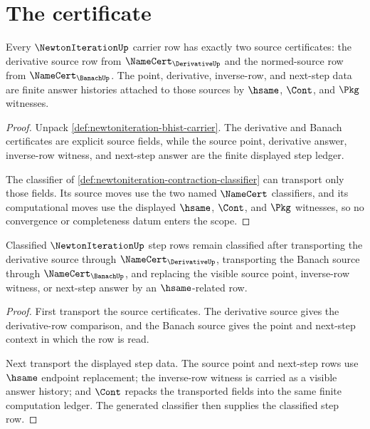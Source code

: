 \section{The certificate}
\label{sec:newtoniteration-certificate}

\begin{theorem}
\label{thm:newtoniteration-banach-derivative-source-scope}
Every $\NewtonIterationUp$ carrier row has exactly two source certificates: the derivative source row from $\NameCert_{\DerivativeUp}$ and the normed-source row from $\NameCert_{\BanachUp}$. The point, derivative, inverse-row, and next-step data are finite answer histories attached to those sources by $\hsame$, $\Cont$, and $\Pkg$ witnesses.
\end{theorem}
\begin{proof}
Unpack \autoref{def:newtoniteration-bhist-carrier}. The derivative and Banach certificates are explicit source fields, while the source point, derivative answer, inverse-row witness, and next-step answer are the finite displayed step ledger.

The classifier of \autoref{def:newtoniteration-contraction-classifier} can transport only those fields. Its source moves use the two named $\NameCert$ classifiers, and its computational moves use the displayed $\hsame$, $\Cont$, and $\Pkg$ witnesses, so no convergence or completeness datum enters the scope.
\end{proof}

\begin{theorem}
\label{thm:newtoniteration-step-stability}
Classified $\NewtonIterationUp$ step rows remain classified after transporting the derivative source through $\NameCert_{\DerivativeUp}$, transporting the Banach source through $\NameCert_{\BanachUp}$, and replacing the visible source point, inverse-row witness, or next-step answer by an $\hsame$-related row.
\end{theorem}
\begin{proof}
First transport the source certificates. The derivative source gives the derivative-row comparison, and the Banach source gives the point and next-step context in which the row is read.

Next transport the displayed step data. The source point and next-step rows use $\hsame$ endpoint replacement; the inverse-row witness is carried as a visible answer history; and $\Cont$ repacks the transported fields into the same finite computation ledger. The generated classifier then supplies the classified step row.
\end{proof}

